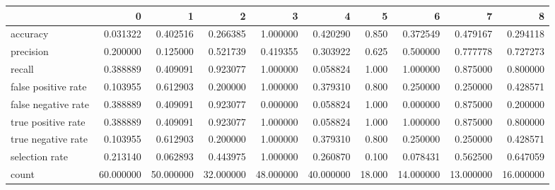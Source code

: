 \begin{tabular}{lrrrrrrrrr}
\toprule
{} &          0 &          1 &          2 &          3 &          4 &       5 &          6 &          7 &          8 \\
\midrule
accuracy            &   0.031322 &   0.402516 &   0.266385 &   1.000000 &   0.420290 &   0.850 &   0.372549 &   0.479167 &   0.294118 \\
precision           &   0.200000 &   0.125000 &   0.521739 &   0.419355 &   0.303922 &   0.625 &   0.500000 &   0.777778 &   0.727273 \\
recall              &   0.388889 &   0.409091 &   0.923077 &   1.000000 &   0.058824 &   1.000 &   1.000000 &   0.875000 &   0.800000 \\
false positive rate &   0.103955 &   0.612903 &   0.200000 &   1.000000 &   0.379310 &   0.800 &   0.250000 &   0.250000 &   0.428571 \\
false negative rate &   0.388889 &   0.409091 &   0.923077 &   0.000000 &   0.058824 &   1.000 &   0.000000 &   0.875000 &   0.200000 \\
true positive rate  &   0.388889 &   0.409091 &   0.923077 &   1.000000 &   0.058824 &   1.000 &   1.000000 &   0.875000 &   0.800000 \\
true negative rate  &   0.103955 &   0.612903 &   0.200000 &   1.000000 &   0.379310 &   0.800 &   0.250000 &   0.250000 &   0.428571 \\
selection rate      &   0.213140 &   0.062893 &   0.443975 &   1.000000 &   0.260870 &   0.100 &   0.078431 &   0.562500 &   0.647059 \\
count               &  60.000000 &  50.000000 &  32.000000 &  48.000000 &  40.000000 &  18.000 &  14.000000 &  13.000000 &  16.000000 \\
\bottomrule
\end{tabular}
